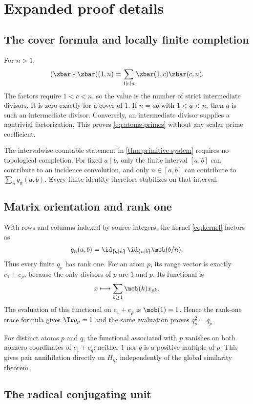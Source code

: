 \section{Expanded proof details}
\label{app:proofs}

\subsection{The cover formula and locally finite completion}

For \(n>1\),
\[
(\zbar*\zbar)(1,n)
=\sum_{1\mid c\mid n}\zbar(1,c)\zbar(c,n).
\]
The factors require \(1<c<n\), so the value is the number of strict
intermediate divisors. It is zero exactly for a cover of \(1\). If \(n=ab\)
with \(1<a<n\), then \(a\) is such an intermediate divisor. Conversely, an
intermediate divisor supplies a nontrivial factorization. This proves
\eqref{eq:atoms-primes} without any scalar prime coefficient.

The intervalwise countable statement in
\cref{thm:primitive-system} requires no topological completion. For fixed
\(a\mid b\), only the finite interval \([a,b]\) can contribute to an
incidence convolution, and only \(n\in[a,b]\) can contribute to
\(\sum_n q_n(a,b)\). Every finite identity therefore stabilizes on that
interval.

\subsection{Matrix orientation and rank one}

With rows and columns indexed by source integers, the kernel
\eqref{eq:kernel} factors as
\[
q_n(a,b)
=\id_{\{a\mid n\}}\,
  \id_{\{n\mid b\}}\mob(b/n).
\]
Thus every finite \(q_n\) has rank one. For an atom \(p\), its range vector is
exactly \(e_1+e_p\), because the only divisors of \(p\) are \(1\) and \(p\).
Its functional is
\[
x\longmapsto\sum_{k\ge1}\mob(k)x_{pk}.
\]
The evaluation of this functional on \(e_1+e_p\) is
\(\mob(1)=1\). Hence the rank-one trace formula gives \(\Tr q_p=1\)
and the same evaluation proves \(q_p^2=q_p\).

For distinct atoms \(p\) and \(q\), the functional associated with \(p\)
vanishes on both nonzero coordinates of \(e_1+e_q\): neither \(1\) nor \(q\)
is a positive multiple of \(p\). This gives pair annihilation directly on
\(H_\eta\), independently of the global similarity theorem.

\subsection{The radical conjugating unit}

